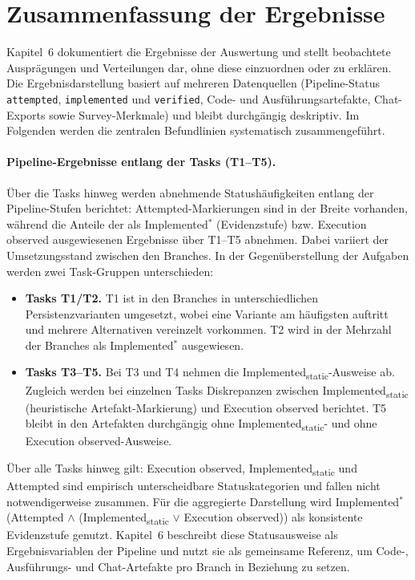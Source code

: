 \section{Zusammenfassung der Ergebnisse}
\label{sec:results_summary}

Kapitel~6 dokumentiert die Ergebnisse der Auswertung und stellt beobachtete Ausprägungen und Verteilungen dar, ohne diese einzuordnen oder zu erklären.
Die Ergebnisdarstellung basiert auf mehreren Datenquellen (Pipeline-Status \,\texttt{attempted}, \texttt{implemented} und \texttt{verified}, Code- und Ausführungsartefakte, Chat-Exports sowie Survey-Merkmale) und bleibt durchgängig deskriptiv.
Im Folgenden werden die zentralen Befundlinien systematisch zusammengeführt.

\paragraph{Pipeline-Ergebnisse entlang der Tasks (T1--T5).}
Über die Tasks hinweg werden abnehmende Statushäufigkeiten entlang der Pipeline-Stufen berichtet: Attempted-Markierungen sind in der Breite vorhanden, während die Anteile der als Implemented$^\ast$ (Evidenzstufe) bzw. Execution observed ausgewiesenen Ergebnisse über T1--T5 abnehmen.
Dabei variiert der Umsetzungsstand zwischen den Branches.
In der Gegenüberstellung der Aufgaben werden zwei Task-Gruppen unterschieden:
\begin{itemize}
\item  \textbf{Tasks T1/T2.} T1 ist in den Branches in unterschiedlichen Persistenzvarianten umgesetzt, wobei eine Variante am häufigsten auftritt und mehrere Alternativen vereinzelt vorkommen. T2 wird in der Mehrzahl der Branches als Implemented$^\ast$ ausgewiesen.
\item  \textbf{Tasks T3--T5.} Bei T3 und T4 nehmen die Implemented\textsubscript{static}-Ausweise ab. Zugleich werden bei einzelnen Tasks Diskrepanzen zwischen Implemented\textsubscript{static} (heuristische Artefakt-Markierung) und Execution observed berichtet. T5 bleibt in den Artefakten durchgängig ohne Implemented\textsubscript{static}- und ohne Execution observed-Ausweise.
\end{itemize}
Über alle Tasks hinweg gilt: Execution observed, Implemented\textsubscript{static} und Attempted sind empirisch unterscheidbare Statuskategorien und fallen nicht notwendigerweise zusammen. Für die aggregierte Darstellung wird Implemented$^\ast$ (Attempted $\wedge$ (Implemented\textsubscript{static} $\vee$ Execution observed)) als konsistente Evidenzstufe genutzt.
Kapitel~6 beschreibt diese Statusausweise als Ergebnisvariablen der Pipeline und nutzt sie als gemeinsame Referenz, um Code-, Ausführungs- und Chat-Artefakte pro Branch in Beziehung zu setzen.

